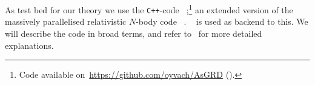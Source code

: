 




















As test bed for our theory we use the \texttt{C++}-code \asgrd~\citep{christiansenGravitationalWavesDark2024};\footnote{Code available on~\url{https://github.com/oyvach/AsGRD} (\thismonthyear).} an extended version of the massively parallelised relativistic $N$-body code \gevolution~\citep{adamekGeneralRelativityCosmic2016}. \latfield~\citep{daverioLatfield2LibraryClassical2016} is used as backend to this. %
We will describe the code in broad terms, and refer to~\citet{christiansenAsevolutionRelativisticNbody2023,christiansenAsimulationDomainFormation2024,adamekGevolutionCosmologicalNbody2016,christiansenGravitationalWavesDark2024,daverioLatfield2LibraryClassical2016,adamekGeneralRelativityCosmic2016} for more detailed explanations.

